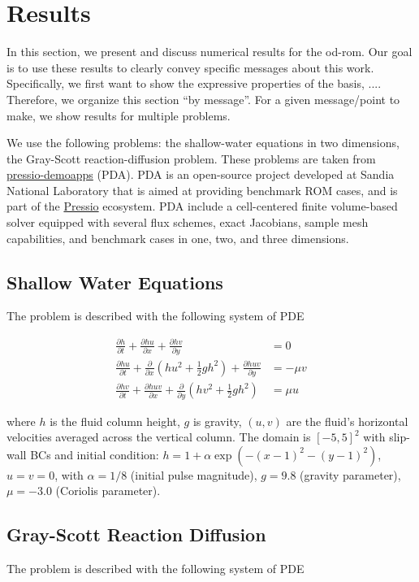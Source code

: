 

\section{Results} \label{sec:results}

In this section, we present and discuss numerical results for the od-rom.
Our goal is to use these results to clearly convey specific messages about this work.
Specifically, we first want to show the expressive properties of the basis, ....
Therefore, we organize this section ``by message''.
For a given message/point to make, we show results for multiple problems.




We use the following problems: the shallow-water equations in two dimensions, the Gray-Scott reaction-diffusion problem.
These problems are taken from \href{https://pressio.github.io/pressio-demoapps}{\textsf{pressio-demoapps}} (PDA).
PDA is an open-source project developed at Sandia National Laboratory that is aimed at providing benchmark ROM cases, and is part of the \href{https://pressio.github.io/}{\textsf{Pressio}} ecosystem.
PDA include a cell-centered finite volume-based solver equipped with several flux schemes, exact Jacobians, sample mesh capabilities, and benchmark cases in one, two, and three dimensions.

\subsection{Shallow Water Equations}

The problem is described with the following system of PDE

\begin{align}
  \frac{\partial h}{\partial t} + \frac{\partial hu}{\partial x} + \frac{\partial hv}{\partial y} &= 0 \\
  \frac{\partial hu}{\partial t} + \frac{\partial }{\partial x} (hu^2 + \frac{1}{2}g h^2) + \frac{\partial huv}{\partial y} &= -\mu v \\
  \frac{\partial hv}{\partial t} + \frac{\partial huv}{\partial x} + \frac{\partial }{\partial y} (hv^2 + \frac{1}{2}g h^2) &= \mu u
\end{align}

where $h$ is the fluid column height, $g$ is gravity, $(u, v)$ are the fluid's horizontal velocities averaged across the vertical column.
The domain is $[-5, 5]^2$ with slip-wall BCs and initial condition: $h = 1 + \alpha \exp( -(x-1)^2 - (y-1)^2)$, $u = v = 0$,
with $\alpha = 1/8$ (initial pulse magnitude), $g = 9.8$ (gravity parameter), $\mu = -3.0$ (Coriolis parameter).


\subsection{Gray-Scott Reaction Diffusion}

The problem is described with the following system of PDE
